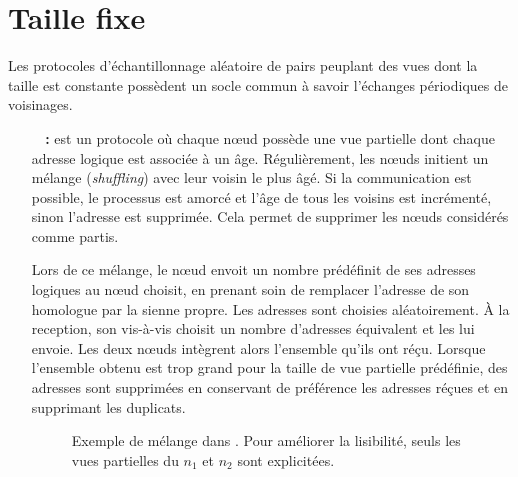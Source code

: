 

\section{Taille fixe}

Les protocoles d'échantillonnage aléatoire de pairs peuplant des vues dont la
taille est constante possèdent un socle commun à savoir l'échanges périodiques
de voisinages.

\begin{itemize}
\item [\textbf{\CYCLON~\cite{voulgaris2005cyclon} :}] est un protocole où chaque
  nœud possède une vue partielle dont chaque adresse logique est associée à un
  âge. Régulièrement, les nœuds initient un mélange (\emph{shuffling}) avec leur
  voisin le plus âgé. Si la communication est possible, le processus est amorcé
  et l'âge de tous les voisins est incrémenté, sinon l'adresse est
  supprimée. Cela permet de supprimer les nœuds considérés comme partis.

  Lors de ce mélange, le nœud envoit un nombre prédéfinit de ses adresses
  logiques au nœud choisit, en prenant soin de remplacer l'adresse de son
  homologue par la sienne propre. Les adresses sont choisies aléatoirement. À la
  reception, son vis-à-vis choisit un nombre d'adresses équivalent et les lui
  envoie. Les deux nœuds intègrent alors l'ensemble qu'ils ont réçu. Lorsque
  l'ensemble obtenu est trop grand pour la taille de vue partielle prédéfinie,
  des adresses sont supprimées en conservant de préférence les adresses réçues
  et en supprimant les duplicats.
  
  \begin{figure}
    \centering
    \hspace{35pt}
    \caption{\label{net:fig:cyclonexample} Exemple de mélange dans \CYCLON. Pour
      améliorer la lisibilité, seuls les vues partielles du $n_1$ et $n_2$ sont
      explicitées.}
  \end{figure}
  

\end{itemize}
